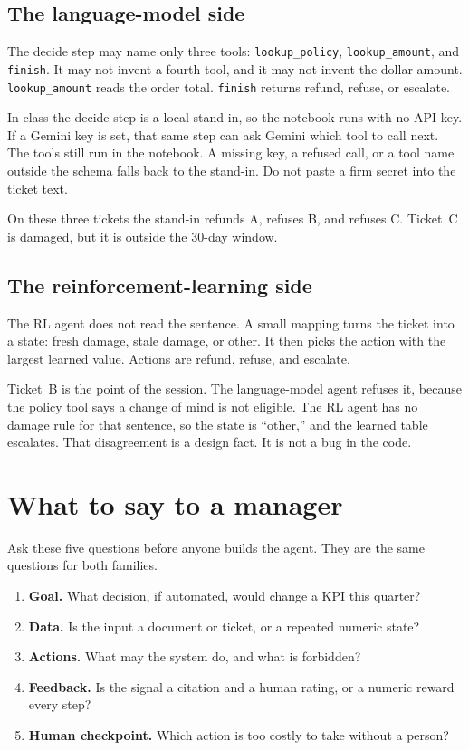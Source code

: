 \documentclass[11pt]{article}
\begin{document}
\subsection{The language-model side}

The decide step may name only three tools: \texttt{lookup\_policy}, \texttt{lookup\_amount}, and \texttt{finish}. It may not invent a fourth tool, and it may not invent the dollar amount. \texttt{lookup\_amount} reads the order total. \texttt{finish} returns refund, refuse, or escalate.

In class the decide step is a local stand-in, so the notebook runs with no API key. If a Gemini key is set, that same step can ask Gemini which tool to call next. The tools still run in the notebook. A missing key, a refused call, or a tool name outside the schema falls back to the stand-in. Do not paste a firm secret into the ticket text.

On these three tickets the stand-in refunds A, refuses B, and refuses C. Ticket~C is damaged, but it is outside the 30-day window.

\subsection{The reinforcement-learning side}

The RL agent does not read the sentence. A small mapping turns the ticket into a state: fresh damage, stale damage, or other. It then picks the action with the largest learned value. Actions are refund, refuse, and escalate.

Ticket~B is the point of the session. The language-model agent refuses it, because the policy tool says a change of mind is not eligible. The RL agent has no damage rule for that sentence, so the state is ``other,'' and the learned table escalates. That disagreement is a design fact. It is not a bug in the code.

\section{What to say to a manager}

Ask these five questions before anyone builds the agent. They are the same questions for both families.

\begin{enumerate}
\item \textbf{Goal.} What decision, if automated, would change a KPI this quarter?
\item \textbf{Data.} Is the input a document or ticket, or a repeated numeric state?
\item \textbf{Actions.} What may the system do, and what is forbidden?
\item \textbf{Feedback.} Is the signal a citation and a human rating, or a numeric reward every step?
\item \textbf{Human checkpoint.} Which action is too costly to take without a person?
\end{enumerate}
\end{document}
